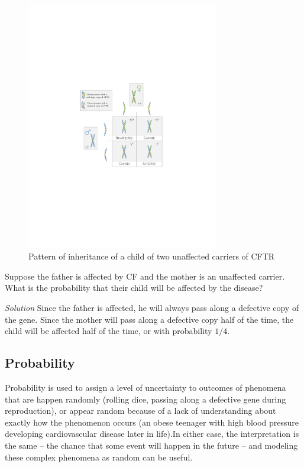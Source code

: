 \begin{figure}
\includegraphics[width= 0.75\textwidth]{./figures/cfInheritance/cfInheritance.pdf}
\caption{Pattern of inheritance of a child of two unaffected carriers of CFTR}
\label{fig:cfInheritance}
\end{figure}


\begin{exercise}
Suppose the father is affected by CF and the mother is an unaffected carrier.  What is the probability that their child will be affected by the disease?

\textit{Solution}  Since the father is affected, he will always pass along a defective copy of the gene.  Since the mother will pass along a defective copy half of the time, the child will be affected half of the time, or with probability $1/4$.

\end{exercise}

\subsection{Probability}


Probability is used to assign a level of uncertainty to outcomes of phenomena that are happen randomly (rolling dice, passing along a defective gene during reproduction), or appear random because of a lack of understanding about exactly  how the phenomenon occurs (an obese teenager with high blood pressure developing cardiovascular disease later in life).In either case, the interpretation is the same -- the chance that some event will happen in the future -- and modeling these complex phenomena as random can be useful.

